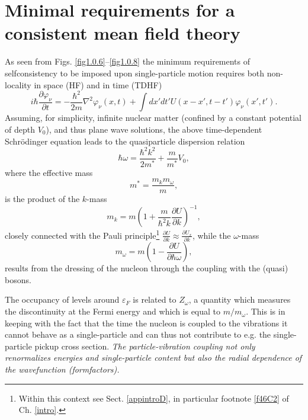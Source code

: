 \section[Minimal mean field theory]{Minimal requirements for a consistent mean field theory}\label{C6AppA}
As seen from Figs. \ref{fig1.0.6}--\ref{fig1.0.8}  the minimum requirements of selfconsistency to be imposed upon single-particle motion requires both non-locality in space (HF) and in time (TDHF)
\begin{equation}\label{eq6.A.1}
i\hbar \frac{\partial \varphi_\nu}{\partial t}=-\frac{\hbar^2}{2 m}\nabla^2 \varphi_\nu(x,t)+\int dx'dt'U(x-x',t-t')\varphi_\nu(x',t').
\end{equation}
 Assuming, for simplicity, infinite nuclear matter (confined by a constant potential of depth $V_0$), and thus plane wave solutions, the above time-dependent Schr\"{o}dinger equation leads to the quasiparticle dispersion relation 
\begin{equation}\label{eq6.A.2}
\hbar\omega=\frac{\hbar^2k^2}{2m^*}+\frac{m}{m^*}V_0,
\end{equation}
where the effective mass
\begin{equation}\label{eq4.A.3}
m^*=\frac{m_k m_\omega}{m},
\end{equation}
is the product of the $k$-mass 
\begin{equation}
m_k=m\left(1+\frac{m}{\hbar^2k}\frac{\partial U}{\partial k}\right)^{-1},
\end{equation}
closely connected with the Pauli principle\footnote{Within this context see Sect. \ref{appintroD}, in particular footnote \ref{f46C2} of Ch. \ref{intro}.} $\frac{\partial U}{\partial k}\approx \frac{\partial U_x}{\partial k}$, while the $\omega$-mass 
\begin{equation}\label{eq6A5}
m_\omega=m\left(1-\frac{\partial U}{\partial \hbar \omega}\right),
\end{equation}
results from the dressing of the nucleon through the coupling with the (quasi) bosons. 


 The occupancy of levels around $\varepsilon_F$ is related to $Z_\omega$, a quantity which measures the discontinuity at the Fermi energy  and which is equal to $m/m_\omega$.  This is in keeping with the fact that the time the nucleon is coupled to the vibrations it cannot behave as a single-particle and can thus not contribute to e.g. the single-particle pickup cross section. \textit{The particle-vibration coupling not only renormalizes energies and single-particle content but also the radial dependence of the wavefunction (formfactors).}

















